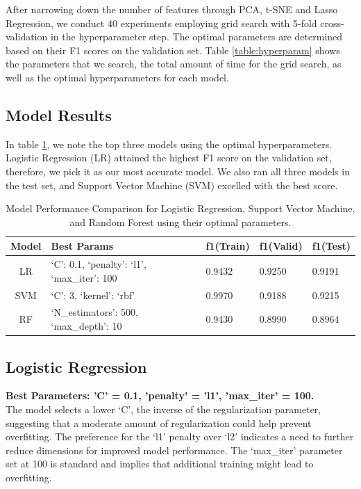 \documentclass[11pt]{article}
\begin{document}
After narrowing down the number of features through PCA, t-SNE and Lasso Regression, we conduct 40 experiments employing grid search with 5-fold cross-validation in the hyperparameter step. The optimal parameters are determined based on their F1 scores on the validation set. Table \ref{table:hyperparam} shows the parameters that we search, the total amount of time for the grid search, as well as the optimal hyperparameters for each model. 

\subsection{Model Results}
In table \ref{table:model_performance}, we note the top three models using the optimal hyperparameters. Logistic Regression (LR) attained the highest F1 score on the validation set, therefore, we pick it as our most accurate model. We also ran all three models in the test set, and Support Vector Machine (SVM) excelled with the best score.

\begin{table}[ht]
\centering
\begin{tabular}{|c|p{4cm}|p{2cm}|p{2cm}|p{2cm}|}
\hline
\textbf{Model} & \textbf{Best Params} & \textbf{f1(Train)} & \textbf{f1(Valid)} & \textbf{f1(Test)} \\
\hline
LR & ‘C’: 0.1, ‘penalty’: ‘l1’, ‘max\_iter’: 100 & 0.9432 & 0.9250 & 0.9191 \\
\hline
SVM & ‘C’: 3, ‘kernel’: ‘rbf’ & 0.9970 & 0.9188 & 0.9215 \\
\hline
RF & ‘N\_estimators’: 500, ‘max\_depth’: 10 & 0.9430 & 0.8990 & 0.8964 \\
\hline
\end{tabular}
\caption{Model Performance Comparison for Logistic Regression, Support Vector Machine, and Random Forest using their optimal parameters.}
\label{table:model_performance}
\end{table}


\subsection{Logistic Regression}
\textbf{Best Parameters: 'C' = 0.1, 'penalty' = 'l1', 'max\_iter' = 100.} \\
The model selects a lower ‘C’, the inverse of the regularization parameter, suggesting that a moderate amount of regularization could help prevent overfitting. The preference for the ‘l1’ penalty over ‘l2’ indicates a need to further reduce dimensions for improved model performance. The ‘max\_iter’ parameter set at 100 is standard and implies that additional training might lead to overfitting.
\end{document}
